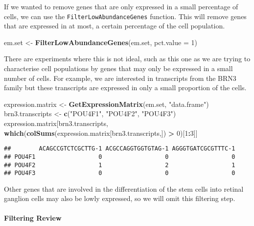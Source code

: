 \documentclass[]{article}
\newenvironment{Shaded}{\begin{snugshade}}{\end{snugshade}}
\newcommand{\DataTypeTok}[1]{\textcolor[rgb]{0.13,0.29,0.53}{#1}}
\newcommand{\DecValTok}[1]{\textcolor[rgb]{0.00,0.00,0.81}{#1}}
\newcommand{\KeywordTok}[1]{\textcolor[rgb]{0.13,0.29,0.53}{\textbf{#1}}}
\newcommand{\NormalTok}[1]{#1}
\newcommand{\OperatorTok}[1]{\textcolor[rgb]{0.81,0.36,0.00}{\textbf{#1}}}
\newcommand{\StringTok}[1]{\textcolor[rgb]{0.31,0.60,0.02}{#1}}
\let\oldparagraph\paragraph
\renewcommand{\paragraph}[1]{\oldparagraph{#1}\mbox{}}
\begin{document}
If we wanted to remove genes that are only expressed in a small
percentage of cells, we can use the \texttt{FilterLowAbundanceGenes}
function. This will remove genes that are expressed in at most, a
certain percentage of the cell population.

\begin{Shaded}
\begin{Highlighting}[]
\NormalTok{em.set <-}\StringTok{ }\KeywordTok{FilterLowAbundanceGenes}\NormalTok{(em.set, }\DataTypeTok{pct.value =} \DecValTok{1}\NormalTok{)}
\end{Highlighting}
\end{Shaded}

There are experiments where this is not ideal, such as this one as we
are trying to characterise cell populations by genes that may only be
expressed in a small number of cells. For example, we are interested in
transcripts from the BRN3 family but these transcripts are expressed in
only a small proportion of the cells.

\begin{Shaded}
\begin{Highlighting}[]
\NormalTok{expression.matrix <-}\StringTok{ }\KeywordTok{GetExpressionMatrix}\NormalTok{(em.set, }\StringTok{"data.frame"}\NormalTok{)}
\NormalTok{brn3.transcripts <-}\StringTok{ }\KeywordTok{c}\NormalTok{(}\StringTok{"POU4F1"}\NormalTok{, }\StringTok{"POU4F2"}\NormalTok{, }\StringTok{"POU4F3"}\NormalTok{)}
\NormalTok{expression.matrix[brn3.transcripts, }
                  \KeywordTok{which}\NormalTok{(}\KeywordTok{colSums}\NormalTok{(expression.matrix[brn3.transcripts,]) }\OperatorTok{>}\StringTok{ }\DecValTok{0}\NormalTok{)[}\DecValTok{1}\OperatorTok{:}\DecValTok{3}\NormalTok{]]}
\end{Highlighting}
\end{Shaded}

\begin{verbatim}
##        ACAGCCGTCTCGCTTG-1 ACGCCAGGTGGTGTAG-1 AGGGTGATCGCGTTTC-1
## POU4F1                  0                  0                  0
## POU4F2                  1                  2                  1
## POU4F3                  0                  0                  0
\end{verbatim}

Other genes that are involved in the differentiation of the stem cells
into retinal ganglion cells may also be lowly expressed, so we will omit
this filtering step.

\hypertarget{filtering-review}{%
\paragraph{Filtering Review}\label{filtering-review}}
\end{document}
